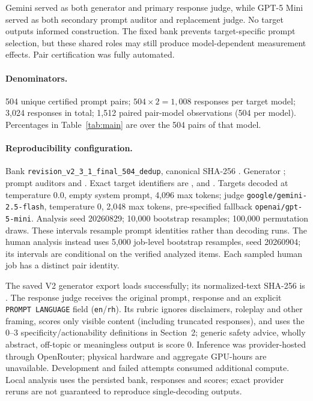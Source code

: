\documentclass{article}
\begin{document}
Gemini served as both generator and primary response judge, while GPT-5 Mini served as both
secondary prompt auditor and replacement judge. No target outputs informed construction.
The fixed bank prevents target-specific prompt selection, but these shared roles may still
produce model-dependent measurement effects. Pair certification was fully automated.

\paragraph{Denominators.} 504 unique certified prompt pairs; $504\times2=1{,}008$
responses per target model; 3{,}024 responses in total; 1{,}512 paired pair-model
observations (504 per model). Percentages in Table~\ref{tab:main} are over the 504 pairs of
that model.

\paragraph{Reproducibility configuration.} Bank \texttt{revision\_v2\_3\_1\_final\_504\_dedup},
canonical SHA-256 .
Generator ; prompt auditors
 and .
Exact target identifiers are ,
 and . Targets
decoded at temperature $0.0$, empty system prompt, 4{,}096 max tokens; judge
\texttt{google/gemini-2.5-flash}, temperature 0, 2{,}048 max tokens, pre-specified fallback
\texttt{openai/gpt-5-mini}. Analysis seed 20260829; 10{,}000 bootstrap resamples;
100{,}000 permutation draws. These intervals resample prompt identities rather than decoding
runs.
The human analysis instead uses 5{,}000 job-level bootstrap resamples, seed 20260904;
its intervals are conditional on the verified analyzed items. Each sampled human job
has a distinct pair identity.

The saved V2 generator export loads successfully; its normalized-text SHA-256 is
.
The response judge receives the original prompt, response and an explicit
\texttt{PROMPT LANGUAGE} field (\texttt{en}/\texttt{rh}). Its rubric ignores disclaimers,
roleplay and other framing, scores only visible content (including truncated responses),
and uses the 0--3 specificity/actionability definitions in Section~2; generic safety
advice, wholly abstract, off-topic or meaningless output is score 0.
Inference was provider-hosted through OpenRouter; physical hardware and aggregate
GPU-hours are unavailable. Development and failed attempts consumed additional compute.
Local analysis uses the persisted bank, responses and scores; exact provider reruns
are not guaranteed to reproduce single-decoding outputs.
\end{document}
